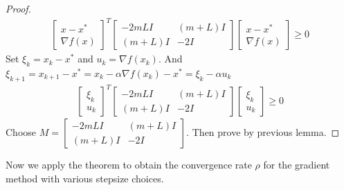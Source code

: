 \documentclass[11pt]{elegantbook}
\begin{document}
\begin{proof}
\begin{equation}
    \begin{aligned}
        \begin{bmatrix}
            x-x^*\\
            \nabla f(x)
        \end{bmatrix}^T
        \begin{bmatrix}
            -2mLI&	(m+L)I\\
            (m+L)I	&-2I
        \end{bmatrix}
        \begin{bmatrix}
            x-x^*\\
            \nabla f(x)
        \end{bmatrix}\geq 0
    \end{aligned}
    \nonumber
\end{equation}
Set $\xi_k=x_k-x^*$ and $u_k=\nabla f(x_k)$. And $\xi_{k+1}=x_{k+1}-x^*=x_k-\alpha \nabla f(x_k)-x^*=\xi_k-\alpha u_k$
\begin{equation}
    \begin{aligned}
        \begin{bmatrix}
            \xi_k\\
            u_k
        \end{bmatrix}^T
        \begin{bmatrix}
            -2mLI&	(m+L)I\\
            (m+L)I	&-2I
        \end{bmatrix}
        \begin{bmatrix}
            \xi_k\\
            u_k
        \end{bmatrix}\geq 0
    \end{aligned}
    \nonumber
\end{equation}
Choose $M=\begin{bmatrix}
    -2mLI&	(m+L)I\\
    (m+L)I	&-2I
\end{bmatrix}$. Then prove by previous lemma.
\end{proof}

Now we apply the theorem to obtain the convergence rate $\rho$ for the gradient method with various stepsize choices.
\end{document}
